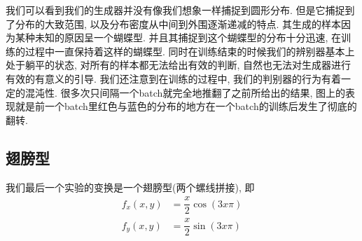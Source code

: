 \documentclass[lang=cn,11pt]{elegantpaper}
\begin{document}
我们可以看到我们的生成器并没有像我们想象一样捕捉到圆形分布. 但是它捕捉到了分布的大致范围, 以及分布密度从中间到外围逐渐递减的特点. 其生成的样本因为某种未知的原因呈一个蝴蝶型. 并且其捕捉到这个蝴蝶型的分布十分迅速, 在训练的过程中一直保持着这样的蝴蝶型. 同时在训练结束的时候我们的辨别器基本上处于躺平的状态, 对所有的样本都无法给出有效的判断, 自然也无法对生成器进行有效的有意义的引导. 我们还注意到在训练的过程中, 我们的判别器的行为有着一定的混沌性. 很多次只间隔一个batch就完全地推翻了之前所给出的结果, 图上的表现就是前一个batch里红色与蓝色的分布的地方在一个batch的训练后发生了彻底的翻转.



\subsection{翅膀型}

我们最后一个实验的变换是一个翅膀型(两个螺线拼接), 即
\begin{align}
	f_x(x,y) &= \dfrac{x}{2} \cos (3x\pi) \\
	f_y(x,y) &= \dfrac{x}{2} \sin (3x\pi)
\end{align}
\end{document}
